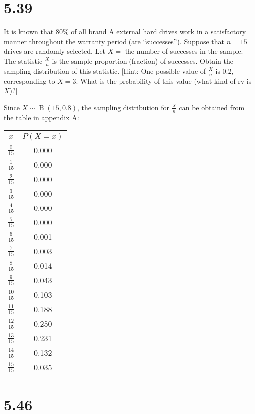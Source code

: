 \documentclass[letterpaper,12pt,fleqn]{article}
\DeclareMathOperator{\bd}{B}
\begin{document}
\section*{5.39}

It is known that 80\% of all brand A external hard drives work in a satisfactory manner throughout the warranty period (are
``successes'').  Suppose that \(n=15\) drives are randomly selected.  Let \(X=\) the number of successes in the sample.  The
statistic \(\frac{X}{n}\) is the sample proportion (fraction) of successes.  Obtain the sampling distribution of this
statistic. [Hint: One possible value of \(\frac{X}{n}\) is 0.2, corresponding to \(X=3\).  What is the probability of this
  value (what kind of rv is \(X\))?]

Since \(X\sim\bd(15,0.8)\), the sampling distribution for \(\frac{X}{n}\) can be obtained from the table in appendix A:

\begingroup
\setlength\extrarowheight{5pt}
\begin{tabular}{c|c}
  \(x\) & \(P(X=x)\) \\
  \hline
  \(\frac{0}{15}\) & 0.000 \\
  \(\frac{1}{15}\) & 0.000 \\
  \(\frac{2}{15}\) & 0.000 \\
  \(\frac{3}{15}\) & 0.000 \\
  \(\frac{4}{15}\) & 0.000 \\
  \(\frac{5}{15}\) & 0.000 \\
  \(\frac{6}{15}\) & 0.001 \\
  \(\frac{7}{15}\) & 0.003 \\
  \(\frac{8}{15}\) & 0.014 \\
  \(\frac{9}{15}\) & 0.043 \\
  \(\frac{10}{15}\) & 0.103 \\
  \(\frac{11}{15}\) & 0.188 \\
  \(\frac{12}{15}\) & 0.250 \\
  \(\frac{13}{15}\) & 0.231 \\
  \(\frac{14}{15}\) & 0.132 \\
  \(\frac{15}{15}\) & 0.035
\end{tabular}
\endgroup

\section*{5.46}
\end{document}
